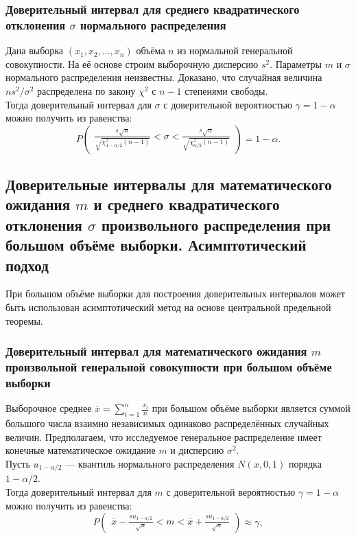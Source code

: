 \subsubsection{Доверительный интервал для среднего квадратического отклонения $\sigma$ нормального распределения}
Дана выборка $(x_1, x_2, ... , x_n)$ объёма $n$ из нормальной генеральной совокупности. На её основе строим выборочную дисперсию $s^2$. Параметры $m$ и $\sigma$ нормального распределения неизвестны. Доказано, что случайная величина $ns^2/\sigma^2$ распределена по закону $\chi^2$ с $n-1$ степенями свободы. \\
Тогда доверительный интервал для $\sigma$ с доверительной вероятностью $\gamma=1-\alpha$ можно получить из равенства:
\begin{equation}
P\begin{pmatrix}\frac{s\sqrt{n}}{\sqrt{\chi_{1-\alpha/2}^2 (n-1)}}<\sigma<\frac{s\sqrt{n}}{\sqrt{\chi_{\alpha/2}^2 (n-1)}}\end{pmatrix}=1-\alpha.
\end{equation}

\subsection{Доверительные интервалы для математического ожидания $m$ и среднего квадратического отклонения $\sigma$ произвольного распределения при большом объёме выборки. Асимптотический подход}
При большом объёме выборки для построения доверительных интервалов может быть использован асимптотический метод на основе центральной предельной теоремы.

\subsubsection{Доверительный интервал для математического ожидания $m$ произвольной генеральной совокупности при большом объёме выборки}
Выборочное среднее $\overline{x}=\sum_{i=1}^n \frac{x_i}{n}$ при большом объёме выборки является суммой большого числа взаимно независимых одинаково распределённых случайных величин. Предполагаем, что исследуемое генеральное распределение имеет конечные математическое ожидание $m$ и дисперсию $\sigma^2$. \\
Пусть $u_{1-\alpha/2}$ — квантиль нормального распределения $N(x, 0, 1)$ порядка $1-\alpha/2$. \\
Тогда доверительный интервал для $m$ с доверительной вероятностью $\gamma=1-\alpha$ можно получить из равенства:
\begin{equation}
P\begin{pmatrix}\overline{x}-\frac{su_{1-\alpha/2}}{\sqrt{n}}<m<\overline{x}+\frac{su_{1-\alpha/2}}{\sqrt{n}}\end{pmatrix}\approx\gamma,
\end{equation}

